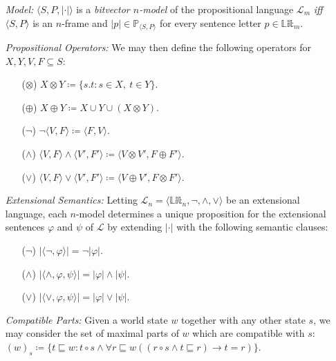 \documentclass[a4paper, 11pt]{article} %
\newcommand{\tuple}[1]{\langle#1\rangle} %
\newcommand{\set}[1]{\lbrace#1\rbrace} %
\renewcommand{\P}[0]{\mathbb{P}}
\newcommand{\Lit}[0]{\mathbb{Lit}}
\renewcommand{\L}[0]{\mathcal{L}}
\renewcommand{\Vert}[1]{\ldbrack#1\rdbrack}
\renewcommand{\vert}[1]{\lvert#1\rvert}
\begin{document}
\begin{enumerate}
  \item[\it Model:] $\tuple{S,P,\vert{\cdot}}$ is a \textit{bitvector $n$-model} of the propositional language $\L_m$ \textit{iff} $\tuple{S,P}$ is an $n$-frame and $\vert{p}\in\P_{\tuple{S,P}}$ for every sentence letter $p\in\Lit_m$.
  \item[\it Propositional Operators:] We may then define the following operators for $X,Y,V,F\subseteq S$:
    \begin{itemize}
      \item[($\otimes$)] $X \otimes Y \coloneq \set{s.t : s \in X,\ t \in Y}$.
      \item[($\oplus$)] $X \oplus Y \coloneq X \cup Y \cup (X \otimes Y)$.
      \item[($\neg$)] $\neg\tuple{V,F} \coloneq \tuple{F,V}$.
      \item[($\wedge$)] $\tuple{V,F}\wedge\tuple{V',F'} \coloneq \tuple{V\otimes V',F\oplus F'}$.
      \item[($\vee$)] $\tuple{V,F}\vee\tuple{V',F'} \coloneq \tuple{V\oplus V',F\otimes F'}$.
    \end{itemize}
  \item[\it Extensional Semantics:] Letting $\L_n=\tuple{\Lit_n,\neg,\wedge,\vee}$ be an extensional language, each $n$-model determines a unique proposition for the extensional sentences $\varphi$ and $\psi$ of $\L$ by extending $\vert{\cdot}$ with the following semantic clauses: 
    \begin{itemize}
      \item[($\neg$)] $\vert{\tuple{\neg,\varphi}}=\neg\vert{\varphi}$.
      \item[($\wedge$)] $\vert{\tuple{\wedge,\varphi,\psi}}=\vert{\varphi}\wedge\vert{\psi}$.
      \item[($\vee$)] $\vert{\tuple{\vee,\varphi,\psi}}=\vert{\varphi}\vee\vert{\psi}$.
    \end{itemize}
  \item[\it Compatible Parts:] Given a world state $w$ together with any other state $s$, we may consider the set of maximal parts of $w$ which are compatible with $s$:\\ 
    $(w)_s\coloneq \set{t\sqsubseteq w:t\circ s \wedge \forall r\sqsubseteq w((r\circ s \wedge t \sqsubseteq r) \rightarrow t = r)}$.

\end{enumerate}
\end{document}
